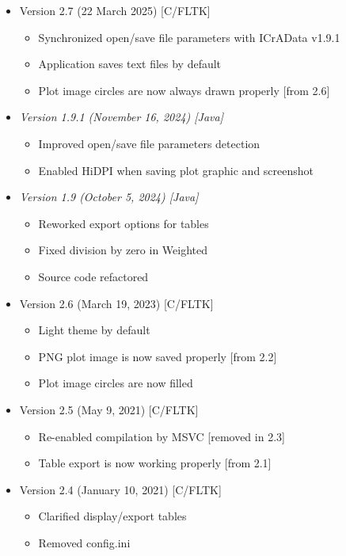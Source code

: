 \documentclass[11pt, a4paper]{article}
\begin{document}
\begin{itemize}
\item Version 2.7 (22 March 2025) [C/FLTK]
\begin{itemize}
\item Synchronized open/save file parameters with ICrAData v1.9.1
\item Application saves text files by default
\item Plot image circles are now always drawn properly [from 2.6]
\end{itemize}

\item {\it Version 1.9.1 (November 16, 2024) [Java]}
\begin{itemize}\it
\item Improved open/save file parameters detection
\item Enabled HiDPI when saving plot graphic and screenshot
\end{itemize}

\item {\it Version 1.9 (October 5, 2024) [Java]}
\begin{itemize}\it
\item Reworked export options for tables
\item Fixed division by zero in Weighted
\item Source code refactored
\end{itemize}

\item Version 2.6 (March 19, 2023) [C/FLTK]
\begin{itemize}
\item Light theme by default
\item PNG plot image is now saved properly [from 2.2]
\item Plot image circles are now filled
\end{itemize}

\item Version 2.5 (May 9, 2021) [C/FLTK]
\begin{itemize}
\item Re-enabled compilation by MSVC [removed in 2.3]
\item Table export is now working properly [from 2.1]
\end{itemize}

\item Version 2.4 (January 10, 2021) [C/FLTK]
\begin{itemize}
\item Clarified display/export tables
\item Removed config.ini
\end{itemize}


\end{itemize}
\end{document}
